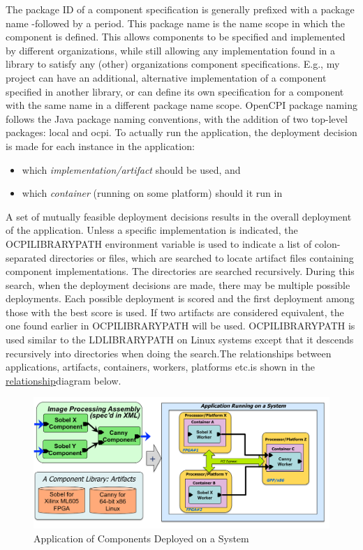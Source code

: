 \documentclass[10pt, a4paper, oneside]{article}
\renewcommand\_{\textunderscore\allowbreak} %
\begin{document}
The package ID of a component specification is generally prefixed with a package name -followed by a period.  This package name is the name scope in which the component is defined. This allows components to be specified and implemented by different organizations, while still allowing any implementation found in a library to satisfy any (other) organizations component specifications.  E.g., my project can have an additional, alternative implementation of a component specified in another library, or can define its own specification for a component with the same name in a different package name scope.  OpenCPI package naming follows the Java package naming conventions, with the addition of two top-level packages: local and ocpi. To actually run the application, the deployment decision is made for each instance in the application:
\begin{itemize}
	\item  which \emph{implementation/artifact} should be used, and
	\item  which \emph{container} (running on some platform) should it run in
\end{itemize}
A set of mutually feasible deployment decisions results in the overall deployment of the application. Unless a specific implementation is indicated, the OCPI\_LIBRARY\_PATH environment variable is used to indicate a list of colon-separated directories or files, which are searched to locate artifact files containing component implementations.  The directories are searched recursively. During this search, when the deployment decisions are made, there may be multiple possible deployments.  Each possible deployment is scored and the first deployment among those with the best score is used.  If two artifacts are considered equivalent, the one found earlier in OCPI\_LIBRARY\_PATH will be used.  OCPI\_LIBRARY\_PATH is used similar to the LD\_LIBRARY\_PATH on Linux systems except that it descends recursively into directories when doing the search.The relationships between applications, artifacts, containers, workers, platforms etc.is shown in the \hyperlink{Components}{relationship}diagram below. 
\begin{figure}[h!]
	\centering
	\includegraphics[width=1.0\linewidth]{Components.png}
 	\caption{Application of Components Deployed on a System}\label{fig:Components}
\end{figure}
\newpage
\end{document}
